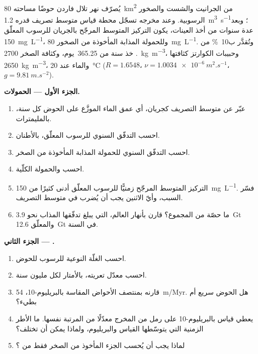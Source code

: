 \begin{problem}
\label{pb:b1:erosion-transport:1}
يُصرّف نهر تلال فاردن حوضًا مساحته \qty{80}{km^2} من الجرانيت والشست والصخور الرسوبية. وعند مخرجه تسجّل محطة قياس متوسط تصريف قدره \qty{1.2}{m^3.s^{-1}}؛ وبعد عدة سنوات من أخذ العينات، يكون التركيز المتوسط المرجّح بالجريان للرسوب المعلّق \qty{150}{mg.L^{-1}}، وللحمولة المذابة المأخوذة من الصخور \qty{80}{mg.L^{-1}}. وتُقدَّر  ب\qty{10}{\percent} من . خذ سنة من \num{365.25}~يوم، وكثافة الصخر \qty{2700}{kg.m^{-3}}، وحبيبات الكوارتز كثافتها \qty{2650}{kg.m^{-3}}، والماء عند \qty{20}{\celsius} ($R
= 1.6548$، $\nu = \qty{1.0034e-6}{m^2.s^{-1}}$، $g = \qty{9.81}{m.s^{-2}}$).

\medskip
\noindent\textbf{الجزء الأول --- الحمولات.}
\begin{enumerate}
  \item عبّر عن متوسط التصريف كجريان، أي عمق الماء الموزَّع على الحوض كل سنة، بالمليمترات.
  \item احسب التدفّق السنوي للرسوب المعلّق، بالأطنان.
  \item احسب التدفّق السنوي للحمولة المذابة المأخوذة من الصخر.
  \item احسب  والحمولة الكلّية.
  \item التركيز المتوسط المرجّح زمنيًّا للرسوب المعلّق أدنى كثيرًا من \qty{150}{mg.L^{-1}}. فسّر السبب، وأيّ الاثنين يجب أن يُضرب في متوسط التصريف.
  \item ما حصّة  من المجموع؟ قارن بأنهار العالم، التي يبلغ تدفّقها المذاب نحو \qty{3.9}{Gt} والمعلّق \qty{12.6}{Gt} في السنة.
\end{enumerate}

\medskip
\noindent\textbf{الجزء الثاني --- .}
\begin{enumerate}[resume]
  \item احسب الغلّة النوعية للرسوب للحوض.
  \item احسب معدّل تعريته، بالأمتار لكل مليون سنة.
  \item قارنه بمنتصف الأحواض المقاسة بالبريليوم-10، \qty{54}{m/Myr}. هل الحوض سريع أم بطيء؟
  \item يعطي قياس بالبريليوم-10 على رمل من المخرج معدّلًا من المرتبة نفسها. ما الأطر الزمنية التي يتوسّطها القياس والبريليوم، ولماذا يمكن أن تختلف؟
  \item لماذا يجب أن يُحسب الجزء المأخوذ من الصخر فقط من ؟
\end{enumerate}


\end{problem}
